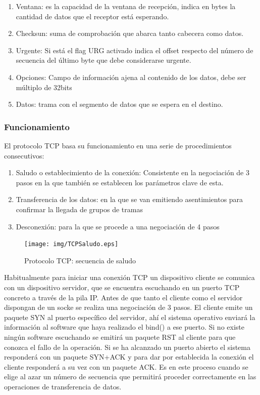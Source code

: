 \documentclass[a4paper,spanish,12pt]{book}
\begin{document}
\begin{enumerate}
	\item{Ventana: es la capacidad de la ventana de recepción, indica en bytes la cantidad de datos que el receptor está esperando.}
	\item{Checksun: suma de comprobación que abarca tanto cabecera como datos.}
	\item{Urgente: Si está el flag URG activado indica el offset respecto del número de secuencia del último byte que debe considerarse urgente.}
	\item{Opciones: Campo de información ajena al contenido de los datos, debe ser múltiplo de 32bits}
	\item{Datos: trama con el segmento de datos que se espera en el destino.}
\end{enumerate}

\subsubsection{Funcionamiento}
El protocolo TCP basa su funcionamiento en una serie de procedimientos consecutivos:
\begin{enumerate}
	\item{Saludo o establecimiento de la conexión: Consistente en la negociación de 3 pasos en la que tambi\'en se establecen los parámetros clave de esta.}
	\item{Transferencia de los datos: en la que se van emitiendo asentimientos para confirmar la llegada de grupos de tramas}
	\item{Desconexión: para la que se procede a una negociación de 4 pasos}
\end{enumerate}

\begin{figure}
	\texttt{[image: img/TCPSaludo.eps]}	
              \caption{Protocolo TCP: secuencia de saludo}
  \label{fig:TCPSaludo}
\end{figure}

Habitualmente para iniciar una conexión TCP un dispositivo cliente se comunica con un dispositivo servidor, que se encuentra escuchando en un puerto TCP concreto a través de la pila IP. Antes de que tanto el cliente como el servidor dispongan de un socke se realiza una negociación de 3 pasos. El cliente emite un paquete SYN al puerto específico del servidor, ahí el sistema operativo enviará la información al software que haya realizado el bind() a ese puerto. Si no existe ningún software escuchando se emitirá un paquete RST al cliente para que conozca el fallo de la operación. Si se ha alcanzado un puerto abierto el sistema responderá con un paquete SYN+ACK y para dar por establecida la conexión el cliente responderá a su vez con un paquete ACK. Es en este proceso cuando se elige al azar un número de secuencia que permitirá proceder correctamente en las operaciones de transferencia de datos.
\end{document}
